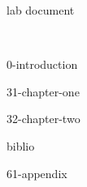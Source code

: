 


\frontmatter %

{lab document} %

\tableofcontents %

\newpage ~ %


{0-introduction}


\mainmatter %

{31-chapter-one}

{32-chapter-two}



\backmatter %
           


{biblio}

\appendix   %


{61-appendix}